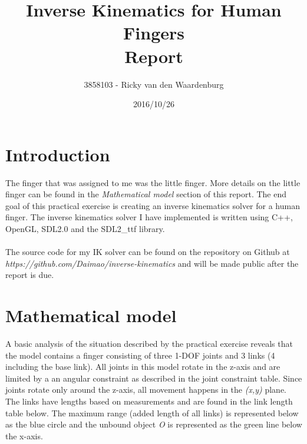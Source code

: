 \documentclass{article}
\title{Inverse Kinematics for Human Fingers \\ \large Report}
\date{2016/10/26}
\author{3858103 - Ricky van den Waardenburg}
\begin{document}
\maketitle
\newpage

\section{Introduction}

The finger that was assigned to me was the little finger. More details on the little finger can be found in the \textit{Mathematical model} section of this report. The end goal of this practical exercise is creating an inverse kinematics solver for a human finger. The inverse kinematics solver I have implemented is written using C++, OpenGL, SDL2.0 and the SDL2\_ttf library. \\\\The source code for my IK solver can be found on the repository on Github at \textit{https://github.com/Daimao/inverse-kinematics} and will be made public after the report is due.

\section{Mathematical model}

A basic analysis of the situation described by the practical exercise reveals that the model contains a finger consisting of three 1-DOF joints and 3 links (4 including the base link). All joints in this model rotate in the z-axis and are limited by a an angular constraint as described in the joint constraint table. Since joints rotate only around the z-axis, all movement happens in the \textit{(x,y)} plane. The links have lengths based on measurements and are found in the link length table below. The maximum range (added length of all links) is represented below as the blue circle and the unbound object \textit{O} is represented as the green line below the x-axis.
\end{document}
